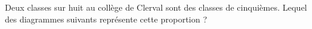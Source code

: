 
\begin{exercice}\label{exosmath-0857}

    Deux classes sur huit au collège de Clerval sont des classes de cinquièmes. Lequel des diagrammes suivants représente cette proportion ?

\begin{center}
   
   
   
\end{center}


\end{exercice}
